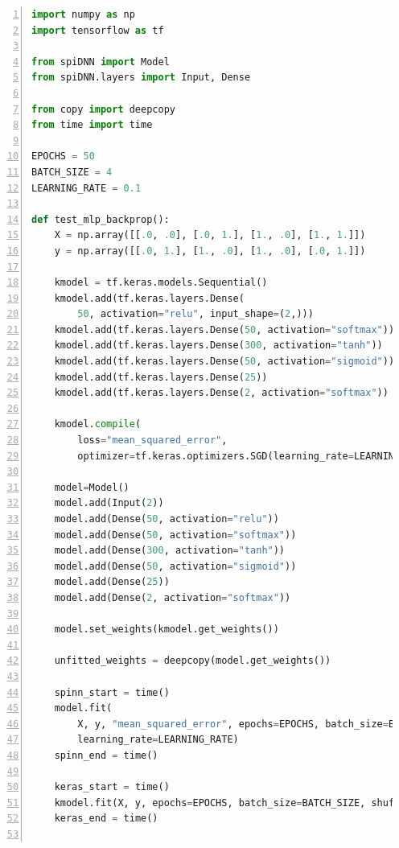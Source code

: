 \documentclass[]{article}
\begin{document}
\begin{appendices}
\newpage

\begin{lstlisting}[language=Python, caption={Excerpt from the test
  suite showing a network similar to the \acrshort{mlp} from
  Listing~\ref{lst:big_models_inference} being trained.
  The \acrshort{mlp} is trained to learn XOR, so the input and output dimensions
  are different from the model shown in
  Listing~\ref{lst:big_models_inference}.
  The backward pass was implemented using shared parameters
  (see Section~\ref{subsec:problems}).}, captionpos=b, numbers=left,
  label={lst:big_mlp_training}]
import numpy as np
import tensorflow as tf

from spiDNN import Model
from spiDNN.layers import Input, Dense

from copy import deepcopy
from time import time

EPOCHS = 50
BATCH_SIZE = 4
LEARNING_RATE = 0.1

def test_mlp_backprop():
    X = np.array([[.0, .0], [.0, 1.], [1., .0], [1., 1.]])
    y = np.array([[.0, 1.], [1., .0], [1., .0], [.0, 1.]])

    kmodel = tf.keras.models.Sequential()
    kmodel.add(tf.keras.layers.Dense(
        50, activation="relu", input_shape=(2,)))
    kmodel.add(tf.keras.layers.Dense(50, activation="softmax"))
    kmodel.add(tf.keras.layers.Dense(300, activation="tanh"))
    kmodel.add(tf.keras.layers.Dense(50, activation="sigmoid"))
    kmodel.add(tf.keras.layers.Dense(25))
    kmodel.add(tf.keras.layers.Dense(2, activation="softmax"))

    kmodel.compile(
        loss="mean_squared_error",
        optimizer=tf.keras.optimizers.SGD(learning_rate=LEARNING_RATE))

    model=Model()
    model.add(Input(2))
    model.add(Dense(50, activation="relu"))
    model.add(Dense(50, activation="softmax"))
    model.add(Dense(300, activation="tanh"))
    model.add(Dense(50, activation="sigmoid"))
    model.add(Dense(25))
    model.add(Dense(2, activation="softmax"))

    model.set_weights(kmodel.get_weights())

    unfitted_weights = deepcopy(model.get_weights())

    spinn_start = time()
    model.fit(
        X, y, "mean_squared_error", epochs=EPOCHS, batch_size=BATCH_SIZE,
        learning_rate=LEARNING_RATE)
    spinn_end = time()

    keras_start = time()
    kmodel.fit(X, y, epochs=EPOCHS, batch_size=BATCH_SIZE, shuffle=False)
    keras_end = time()


\end{lstlisting}
\end{appendices}
\end{document}
